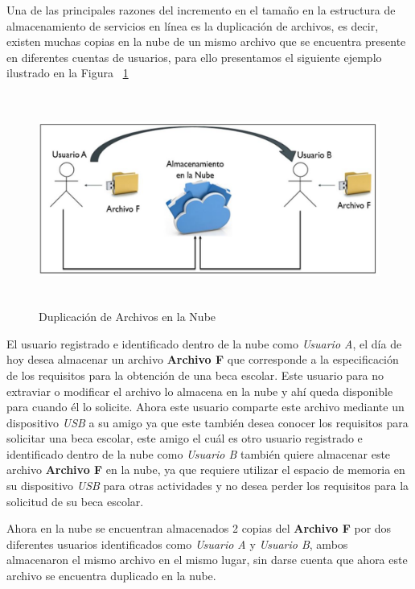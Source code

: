 Una de las principales razones del incremento en el tamaño en la estructura de almacenamiento de servicios en línea es la duplicación de archivos, es decir, existen muchas copias en la nube de un mismo archivo que se encuentra presente en diferentes cuentas de usuarios, para ello presentamos el siguiente ejemplo ilustrado en la Figura ~\ref{fig:1-1-2}

\begin{figure}[H]
\centering
\includegraphics[width=15cm, height=7cm]{./images/duplicacion.JPG}
\caption{Duplicación de Archivos en la Nube}
\label{fig:1-1-2}
\end{figure}


El usuario registrado e identificado dentro de la nube como \textit{Usuario A}, el día de hoy desea almacenar un archivo \textbf{Archivo F} que corresponde a la especificación de los requisitos para la obtención de una beca escolar. Este usuario para no extraviar o modificar el archivo lo almacena en la nube y ahí queda disponible para cuando él lo solicite. Ahora este usuario comparte este archivo mediante un dispositivo \textit{USB} a su amigo ya que este también desea conocer los requisitos para solicitar una beca escolar, este amigo el cuál es otro usuario registrado e identificado dentro de la nube como \textit{Usuario B} también quiere almacenar este archivo \textbf{Archivo F} en la nube, ya que requiere utilizar el espacio de memoria en su dispositivo \textit{USB} para otras actividades y no desea perder los requisitos para la solicitud de su beca escolar. 


Ahora en la nube se encuentran almacenados 2 copias del \textbf{Archivo F} por dos diferentes usuarios identificados como \textit{Usuario A} y \textit{Usuario B}, ambos almacenaron el mismo archivo en el mismo lugar, sin darse cuenta que ahora este archivo se encuentra duplicado en la nube. \\

